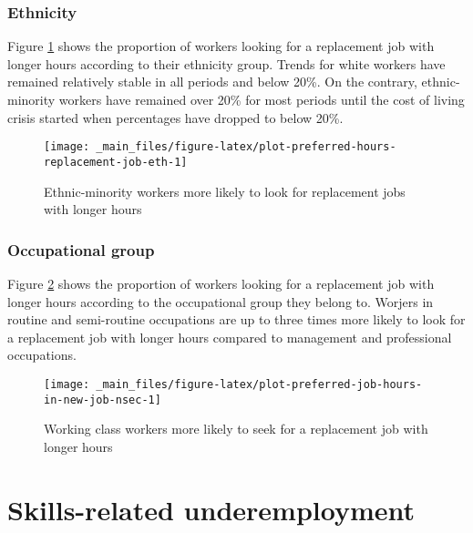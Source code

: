 \documentclass[
]{book}
\begin{document}
\hypertarget{ethnicity-2}{%
\subsection{Ethnicity}\label{ethnicity-2}}

Figure \ref{fig:plot-preferred-hours-replacement-job-eth} shows the proportion of workers looking for a replacement job with longer hours according to their ethnicity group. Trends for white workers have remained relatively stable in all periods and below 20\%. On the contrary, ethnic-minority workers have remained over 20\% for most periods until the cost of living crisis started when percentages have dropped to below 20\%.

\begin{figure}

{\centering \texttt{[image: \_main\_files/figure-latex/plot-preferred-hours-replacement-job-eth-1]} 

}

\caption{Ethnic-minority workers more likely to look for replacement jobs with longer hours}\label{fig:plot-preferred-hours-replacement-job-eth}
\end{figure}

\hypertarget{occupational-group-2}{%
\subsection{Occupational group}\label{occupational-group-2}}

Figure \ref{fig:plot-preferred-job-hours-in-new-job-nsec} shows the proportion of workers looking for a replacement job with longer hours according to the occupational group they belong to. Worjers in routine and semi-routine occupations are up to three times more likely to look for a replacement job with longer hours compared to management and professional occupations.

\begin{figure}

{\centering \texttt{[image: \_main\_files/figure-latex/plot-preferred-job-hours-in-new-job-nsec-1]} 

}

\caption{Working class workers more likely to seek for a replacement job with longer hours}\label{fig:plot-preferred-job-hours-in-new-job-nsec}
\end{figure}

\hypertarget{skills-related-underemployment}{%
\chapter{Skills-related underemployment}\label{skills-related-underemployment}}
\end{document}
